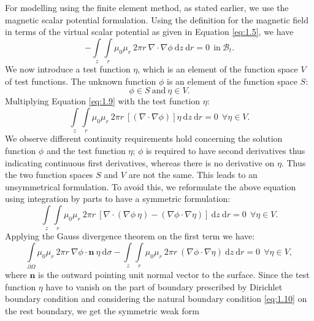 For modelling using the finite element method, as stated earlier, we use the magnetic scalar potential formulation. Using the definition for the magnetic field in terms of the virtual scalar potential as given in Equation \eqref{eq:1.5}, we have
\begin{equation}
-\int\limits_{z} \int\limits_{r} \mu_0 \mu_r \ 2 \pi r \ \nabla \cdot \nabla \phi \ \mathrm{d}z \ \mathrm{d}r = 0 \ \ \text{in} \ \mathcal{B}_t.
\label{eq:1.9}
\end{equation}
We now introduce a test function $\eta$, which is an element of the function space $V$ of test functions. The unknown function $\phi$ is an element of the function space $S$:
\begin{equation}
\phi \in S \ \text{and} \ \eta \in V.
\end{equation}
Multiplying Equation \eqref{eq:1.9} with the test function $\eta$:
\begin{equation}
\int\limits_{z} \int\limits_{r} \mu_0 \mu_r \ 2 \pi r \ [(\nabla \cdot \nabla \phi)] \eta \ \mathrm{d}z \ \mathrm{d}r = 0 \ \ \forall \eta \in V.
\end{equation}
We observe different continuity requirements hold concerning the solution function $\phi$ and the test function $\eta$; $\phi$ is required to have second derivatives thus indicating continuous first derivatives, whereas there is no derivative on $\eta$. Thus the two function spaces $S$ and $V$ are not the same. This leads to an unsymmetrical formulation. To avoid this, we reformulate the above equation using integration by parts to have a symmetric formulation:
\begin{equation}
\int\limits_{z} \int\limits_{r} \mu_0 \mu_r \ 2 \pi r \ [ \nabla \cdot (\nabla\phi \ \eta) - (\nabla \phi \cdot \nabla \eta) ] \ \mathrm{d}z \ \mathrm{d}r = 0 \ \ \forall \eta \in V.
\end{equation}
Applying the Gauss divergence theorem on the first term we have:
\begin{equation}
\int\limits_{\partial \Omega} \mu_0 \mu_r \ 2 \pi r \ \nabla \phi \cdot \mathbf{n} \ \eta \ \mathrm{d}\sigma - \int\limits_{z} \int\limits_{r} \mu_0 \mu_r \ 2 \pi r \ (\nabla \phi \cdot \nabla \eta) \ \mathrm{d}z \ \mathrm{d}r = 0 \ \ \forall \eta \in V,
\end{equation}
where $\mathbf{n}$ is the outward pointing unit normal vector to the surface. Since the test function $\eta$ have to vanish on the part of boundary prescribed by Dirichlet boundary condition and considering the natural boundary condition \eqref{eq:1.10} on the rest boundary, we get the symmetric weak form
